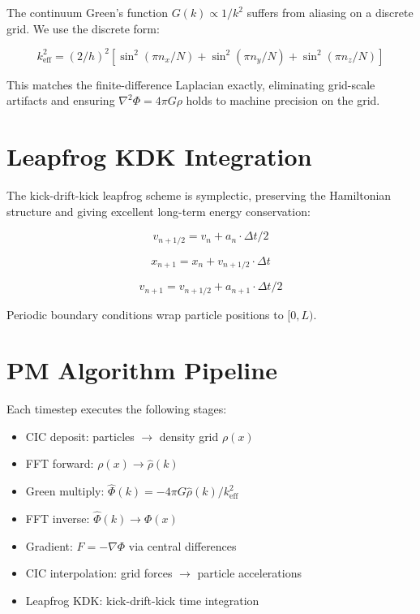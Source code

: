 The continuum Green's function $G(k) \propto 1/k^2$ suffers from
aliasing on a discrete grid. We use the discrete form:

\begin{equation}
k_{\text{eff}}^2 = (2/h)^2 [\sin^2(\pi n_x/N) + \sin^2(\pi n_y/N) + \sin^2(\pi n_z/N)]
\end{equation}

This matches the finite-difference Laplacian exactly, eliminating
grid-scale artifacts and ensuring $\nabla^2 \Phi = 4\pi G \rho$ holds
to machine precision on the grid.

\section{Leapfrog KDK Integration}

The kick-drift-kick leapfrog scheme is symplectic, preserving the
Hamiltonian structure and giving excellent long-term energy conservation:

\begin{equation}
v_{n+1/2} = v_n + a_n \cdot \Delta t / 2
\end{equation}

\begin{equation}
x_{n+1} = x_n + v_{n+1/2} \cdot \Delta t
\end{equation}

\begin{equation}
v_{n+1} = v_{n+1/2} + a_{n+1} \cdot \Delta t / 2
\end{equation}

Periodic boundary conditions wrap particle positions to $[0, L)$.

\section{PM Algorithm Pipeline}

Each timestep executes the following stages:

\begin{itemize}
\item CIC deposit: particles $\to$ density grid $\rho(x)$
\item FFT forward: $\rho(x) \to \hat{\rho}(k)$
\item Green multiply: $\hat{\Phi}(k) = -4\pi G \hat{\rho}(k) / k_{\text{eff}}^2$
\item FFT inverse: $\hat{\Phi}(k) \to \Phi(x)$
\item Gradient: $F = -\nabla \Phi$ via central differences
\item CIC interpolation: grid forces $\to$ particle accelerations
\item Leapfrog KDK: kick-drift-kick time integration
\end{itemize}

